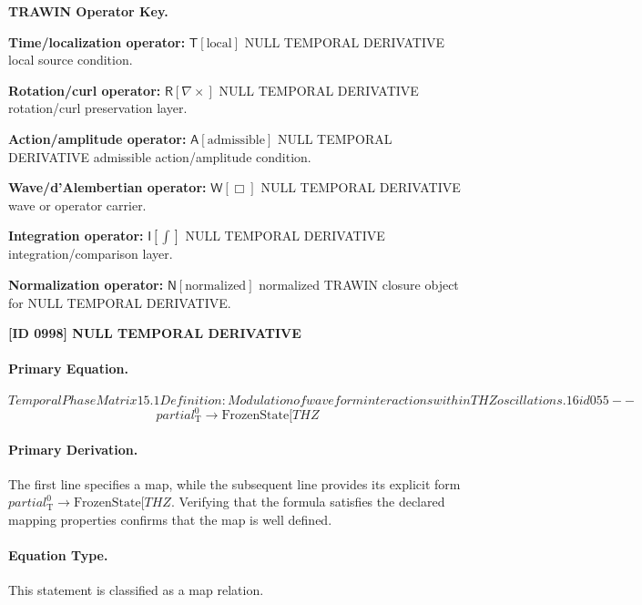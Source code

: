 \par\vspace{0.45\baselineskip}
\noindent\begin{minipage}[t]{\linewidth}
\begingroup
\small
\raggedright
\textbf{TRAWIN Operator Key.}\par
\noindent\textbf{Time/localization operator:} $\mathsf{T}\!\left[\mathrm{local}\right]$ NULL TEMPORAL DERIVATIVE local source condition.\par
\noindent\textbf{Rotation/curl operator:} $\mathsf{R}\!\left[\nabla\times\right]$ NULL TEMPORAL DERIVATIVE rotation/curl preservation layer.\par
\noindent\textbf{Action/amplitude operator:} $\mathsf{A}\!\left[\mathrm{admissible}\right]$ NULL TEMPORAL DERIVATIVE admissible action/amplitude condition.\par
\noindent\textbf{Wave/d'Alembertian operator:} $\mathsf{W}\!\left[\Box\right]$ NULL TEMPORAL DERIVATIVE wave or operator carrier.\par
\noindent\textbf{Integration operator:} $\mathsf{I}\!\left[\int\right]$ NULL TEMPORAL DERIVATIVE integration/comparison layer.\par
\noindent\textbf{Normalization operator:} $\mathsf{N}\!\left[\mathrm{normalized}\right]$ normalized TRAWIN closure object for NULL TEMPORAL DERIVATIVE.\par
\endgroup
\end{minipage}

\clearpage
\noindent\textbf{[ID 0998] NULL TEMPORAL DERIVATIVE}\par
\vspace{0.35em}
\paragraph{Primary Equation.}
\[
Temporal Phase Matrix 15.1 Definition: Modulation of waveform interactions within THZ oscillations. 16 id055--
\]
\[
partial^0_{\mathrm{T}} \to \text{FrozenState}[THZ
\]

\paragraph{Primary Derivation.}
The first line specifies a map, while the subsequent line provides its explicit form \( partial^0_{\mathrm{T}} \to \text{FrozenState}[THZ \). Verifying that the formula satisfies the declared mapping properties confirms that the map is well defined.
\paragraph{Equation Type.}
This statement is classified as a map relation.

